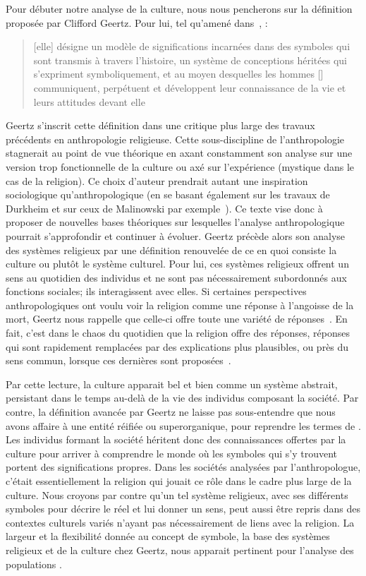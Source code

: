 Pour débuter notre analyse de la culture, nous nous pencherons sur la définition proposée par Clifford Geertz.
Pour lui, tel qu'amené dans~, : \blockquote[{\cite[21]{Geertz1972}}][.]{\textelp{} [elle] désigne un modèle de significations incarnées dans des symboles qui sont transmis à travers l'histoire, un système de conceptions héritées qui s'expriment symboliquement, et au moyen desquelles les hommes [] communiquent, perpétuent et développent leur connaissance de la vie et leurs attitudes devant elle}.
Geertz s'inscrit cette définition dans une critique plus large des travaux précédents en anthropologie religieuse.
Cette sous-discipline de l'anthropologie stagnerait au point de vue théorique en axant constamment son analyse sur une version trop fonctionnelle de la culture ou axé sur l'expérience (mystique dans le cas de la religion).
Ce choix d'auteur prendrait autant une inspiration sociologique qu'anthropologique (en se basant également sur les travaux de Durkheim et sur ceux de Malinowski par exemple~\citep[20]{Geertz1972}).
Ce texte vise donc à proposer de nouvelles bases théoriques sur lesquelles l'analyse anthropologique pourrait s'approfondir et continuer à évoluer.
Geertz précède alors son analyse des systèmes religieux par une définition renouvelée de ce en quoi consiste la culture ou plutôt le système culturel.
Pour lui, ces systèmes religieux offrent un sens au quotidien des individus et ne sont pas nécessairement subordonnés aux fonctions sociales; ils interagissent avec elles.
Si certaines perspectives anthropologiques ont voulu voir la religion comme une réponse à l'angoisse de la mort, Geertz nous rappelle que celle-ci offre toute une variété de réponses~\citep[][37]{Geertz1972}.
En fait, c'est dans le chaos du quotidien que la religion offre des réponses, réponses qui sont rapidement remplacées par des explications plus plausibles, ou près du sens commun, lorsque ces dernières sont proposées~\citep[][39]{Geertz1972}.

Par cette lecture, la culture apparait bel et bien comme un système abstrait, persistant dans le temps au-delà de la vie des individus composant la société.
Par contre, la définition avancée par Geertz ne laisse pas sous-entendre que nous avons affaire à une entité réifiée ou superorganique, pour reprendre les termes de \citet{Duncan1980}.
Les individus formant la société héritent donc des connaissances offertes par la culture pour arriver à comprendre le monde où les symboles qui s'y trouvent portent des significations propres.
Dans les sociétés analysées par l'anthropologue, c'était essentiellement la religion qui jouait ce rôle dans le cadre plus large de la culture.
Nous croyons par contre qu'un tel système religieux, avec ses différents symboles pour décrire le réel et lui donner un sens, peut aussi être repris dans des contextes culturels variés n'ayant pas nécessairement de liens avec la religion.
La largeur et la flexibilité donnée au concept de symbole, la base des systèmes religieux et de la culture chez Geertz, nous apparait pertinent pour l'analyse des populations \lgbt{}.

